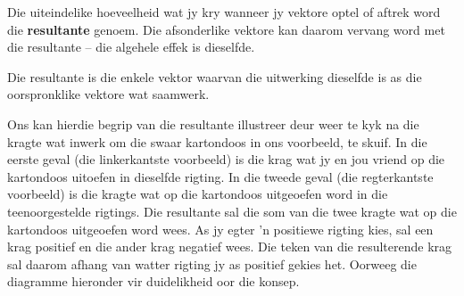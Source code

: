\label{m38813*id188345}Die uiteindelike hoeveelheid wat jy kry wanneer jy vektore optel of aftrek word die \textbf{resultante} genoem. Die afsonderlike vektore kan daarom vervang word met die resultante – die algehele effek is dieselfde.\\

 {Die resultante is die enkele vektor waarvan die uitwerking dieselfde is as die oorspronklike vektore wat saamwerk. } 

Ons kan hierdie begrip van die resultante illustreer deur weer te kyk na die kragte wat inwerk om die swaar kartondoos in ons voorbeeld, te skuif. In die eerste geval (die linkerkantste voorbeeld) is die krag wat jy en jou vriend op die kartondoos uitoefen in dieselfde rigting. In die tweede geval (die regterkantste voorbeeld) is die kragte wat op die kartondoos uitgeoefen word in die teenoorgestelde rigtings. Die resultante sal die som van die twee kragte wat op die kartondoos uitgeoefen word wees. As jy egter  'n positiewe rigting kies, sal een krag positief en die ander krag negatief wees. Die teken van die resulterende krag sal daarom afhang van watter rigting jy as positief gekies het. Oorweeg die diagramme hieronder vir duidelikheid oor die konsep.\\

